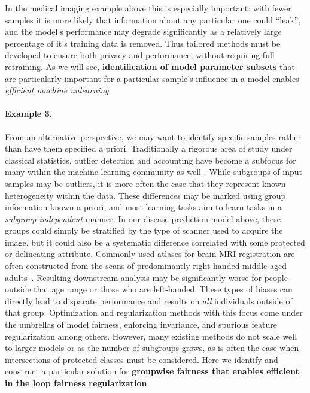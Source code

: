 In the medical imaging example above this is especially important: with fewer samples it is more likely that information about any particular one could ``leak'', and the model's performance may degrade significantly as a relatively large percentage of it's training data is removed.
Thus tailored methods must be developed to ensure both privacy and performance, without requiring full retraining.
As we will see, 
\textbf{identification of model parameter subsets}
that are particularly important
for a particular sample's influence
in a model enables \textit{efficient machine unlearning}.

\paragraph{Example 3.}
From an alternative perspective, we may want to identify specific samples rather than have them specified a priori.
Traditionally a rigorous area of study under classical statistics, outlier detection and accounting have become a subfocus for many within the machine learning community as well \citep{golatkar2020eternal,golatkar2020forgetting,huang2020feature,ren2019likelihood}.
While subgroups of input samples may be outliers, it is more often the case that they represent known heterogeneity within the data. 
These differences may be marked using 
group information known a priori, and 
most learning tasks aim to learn tasks
in a \textit{subgroup-independent} manner.
In our disease prediction model above,
these groups could simply be stratified by the type of scanner used to acquire the image, but it could also
be a systematic difference correlated with some protected or delineating attribute.
Commonly used atlases for brain MRI registration are often constructed
from the scans of predominantly right-handed middle-aged adults~\citep{FONOV2009S102}.
Resulting downstream analysis may be significantly worse
for people outside that age range or those who are left-handed.
These types of biases can directly lead to disparate performance and results on \textit{all} individuals outside of that group.
Optimization and regularization methods with this focus come under the umbrellas of model fairness, enforcing invariance, and spurious feature regularization among others.
However, many existing methods do not scale well to larger models or as the number of subgroups grows,
as is often the case when intersections of protected classes must be considered.
Here we identify and construct a particular solution for \textbf{groupwise fairness that enables efficient in the loop fairness regularization}.

